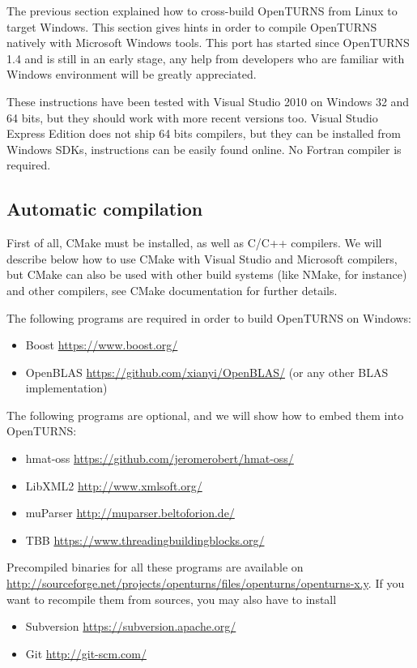 
The previous section explained how to cross-build OpenTURNS from Linux to target Windows.
This section gives hints in order to compile OpenTURNS natively with Microsoft Windows tools.
This port has started since OpenTURNS 1.4 and is still in an early stage, any help from developers
who are familiar with Windows environment will be greatly appreciated.

These instructions have been tested with Visual Studio 2010 on Windows 32 and 64 bits, but they should
work with more recent versions too.
Visual Studio Express Edition does not ship 64 bits compilers, but they can be installed
from Windows SDKs, instructions can be easily found online.  No Fortran compiler is required.

\subsection{Automatic compilation}

First of all, CMake must be installed, as well as C/C++ compilers.  We will describe below how
to use CMake with Visual Studio and Microsoft compilers, but CMake can also be used with other
build systems (like NMake, for instance) and other compilers, see CMake documentation for
further details.

The following programs are required in order to build OpenTURNS on Windows:
\begin{itemize}
\item Boost \url{https://www.boost.org/}
\item OpenBLAS \url{https://github.com/xianyi/OpenBLAS/} (or any other BLAS implementation)
\end{itemize}

The following programs are optional, and we will show how to embed them into OpenTURNS:
\begin{itemize}
\item hmat-oss \url{https://github.com/jeromerobert/hmat-oss/}
\item LibXML2 \url{http://www.xmlsoft.org/}
\item muParser \url{http://muparser.beltoforion.de/}
\item TBB \url{https://www.threadingbuildingblocks.org/}
\end{itemize}

Precompiled binaries for all these programs are available on \url{http://sourceforge.net/projects/openturns/files/openturns/openturns-x.y}.
If you want to recompile them from sources, you may also have to install
\begin{itemize}
\item Subversion \url{https://subversion.apache.org/}
\item Git \url{http://git-scm.com/}
\end{itemize}

